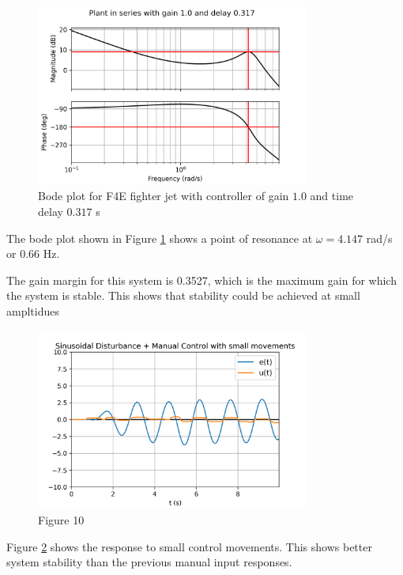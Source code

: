 \documentclass[8pt]{article}
\begin{document}
\begin{figure}[H]
    \centering
    \includegraphics[width=0.8\textwidth]{figures/FIGURE_9.png}
    \caption{Bode plot for F4E fighter jet with controller of gain $1.0$ and time delay $0.317$ s}
    \label{fig:figure9}
\end{figure}

The bode plot shown in Figure \ref{fig:figure9} shows a point of resonance at $\omega = 4.147$ rad/s or $0.66$ Hz.

The gain margin for this system is 0.3527, which is the maximum gain for which the system is stable.
This shows that stability could be achieved at small ampltidues

\newpage

\begin{figure}[H]
    \centering
    \includegraphics[width=0.8\textwidth]{figures/FIGURE_10.png}
    \caption{Figure 10}
    \label{fig:figure10}
\end{figure}

Figure \ref{fig:figure10} shows the response to small control movements. This shows better system stability than the previous manual input responses.
\end{document}
